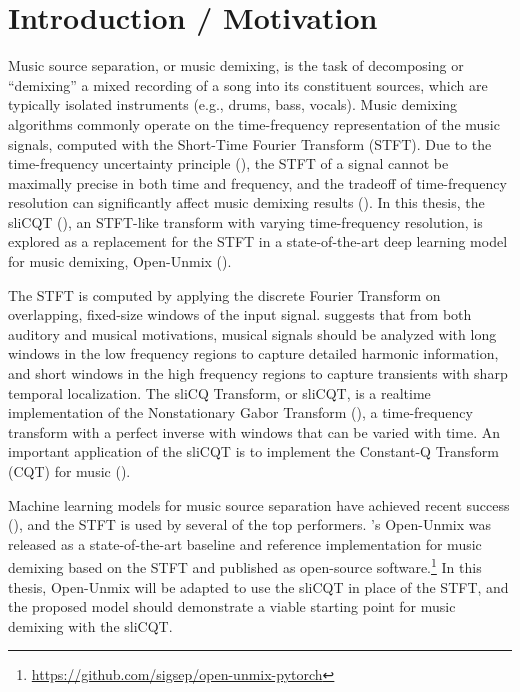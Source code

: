 \documentclass[letter,12pt]{article}
\title{\ThesisTitle}
\author{Sevag Hanssian, sevag.hanssian@mail.mcgill.ca}
\begin{document}
\maketitle

\section{Introduction / Motivation}

Music source separation, or music demixing, is the task of decomposing or ``demixing'' a mixed recording of a song into its constituent sources, which are typically isolated instruments (e.g., drums, bass, vocals). Music demixing algorithms commonly operate on the time-frequency representation of the music signals, computed with the Short-Time Fourier Transform (STFT). Due to the time-frequency uncertainty principle (\cite{gabor1946}), the STFT of a signal cannot be maximally precise in both time and frequency, and the tradeoff of time-frequency resolution can significantly affect music demixing results (\cite{tftradeoff1}). In this thesis, the sliCQT (\cite{slicq}), an STFT-like transform with varying time-frequency resolution, is explored as a replacement for the STFT in a state-of-the-art deep learning model for music demixing, Open-Unmix (\cite{umx}).

The STFT is computed by applying the discrete Fourier Transform on overlapping, fixed-size windows of the input signal. \textcite{doerflerphd} suggests that from both auditory and musical motivations, musical signals should be analyzed with long windows in the low frequency regions to capture detailed harmonic information, and short windows in the high frequency regions to capture transients with sharp temporal localization. The sliCQ Transform, or sliCQT, is a realtime implementation of the Nonstationary Gabor Transform (\cite{balazs}), a time-frequency transform with a perfect inverse with windows that can be varied with time. An important application of the sliCQT is to implement the Constant-Q Transform (CQT) for music (\cite{jbrown}).

Machine learning models for music source separation have achieved recent success (\cite{sisec2018}), and the STFT is used by several of the top performers. \textcite{umx}'s Open-Unmix was released as a state-of-the-art baseline and reference implementation for music demixing based on the STFT and published as open-source software.\footnote{\url{https://github.com/sigsep/open-unmix-pytorch}} In this thesis, Open-Unmix will be adapted to use the sliCQT in place of the STFT, and the proposed model should demonstrate a viable starting point for music demixing with the sliCQT.
\end{document}
